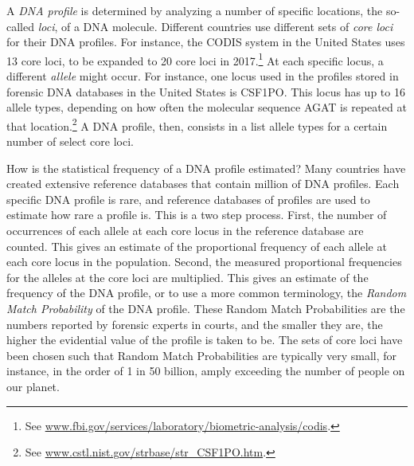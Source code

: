 \documentclass[10pt]{article}
\begin{document}
A \textit{DNA profile} is determined by analyzing a number of specific locations, the so-called \textit{loci}, of a DNA molecule. %
Different countries use different sets of %
\textit{core loci} for their DNA profiles. 
For instance, the CODIS system in the United States uses 13 core loci, to be expanded to 20 core loci in 2017.\footnote{See \url{www.fbi.gov/services/laboratory/biometric-analysis/codis}.} 
At each specific locus, a different \textit{allele} might occur. 
For instance, one locus used in the profiles stored in forensic DNA databases in the United States is CSF1PO. 
This locus has up to 16 allele types, depending on how often the molecular sequence AGAT is repeated at that location.\footnote{See \url{www.cstl.nist.gov/strbase/str\_CSF1PO.htm}.} 
A DNA profile, then, consists in a list allele types for a certain number of select core loci. 


How is the statistical frequency of a DNA profile estimated?
Many countries have created extensive reference databases that contain million of DNA profiles. 
Each specific DNA profile is rare, and reference databases of profiles 
are used to estimate 
how rare a profile 
is.
This is a two step process. First, the number of occurrences of each allele at each core locus in the reference database are counted.
This gives an estimate of the proportional frequency of each allele at each core locus in the population. Second, the measured proportional frequencies for the alleles at the core loci are 
multiplied. This gives an estimate of the frequency of the DNA profile, or to use a more common terminology, 
the \textit{Random Match Probability} of the DNA profile. %
These Random Match Probabilities are the numbers reported by forensic experts in courts, and the smaller they are, the higher the evidential value of the profile is taken to be. The sets of core loci have been chosen such that Random Match Probabilities are typically very small, for instance, in the order of 1 in 50 billion, amply exceeding the number of people on our planet. 
\end{document}
